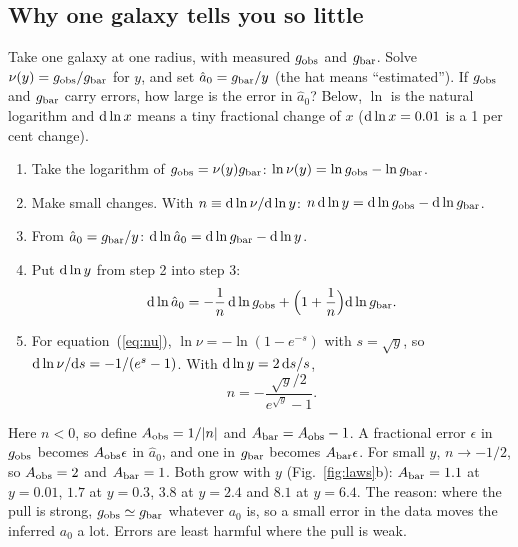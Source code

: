 \documentclass[fleqn,usenatbib]{mnras}
\begin{document}
\subsection{Why one galaxy tells you so little}
\label{sec:amp}
Take one galaxy at one radius, with measured $g_{\rm obs}$ and $g_{\rm bar}$. Solve $\nu(y)=g_{\rm obs}/g_{\rm bar}$ for $y$, and set $\hat a_0=g_{\rm bar}/y$ (the hat means ``estimated''). If $g_{\rm obs}$ and $g_{\rm bar}$ carry errors, how large is the error in $\hat a_0$? Below, $\ln$ is the natural logarithm and ${\rm d}\ln x$ means a tiny fractional change of $x$ (${\rm d}\ln x=0.01$ is a 1 per cent change).
\begin{enumerate}
\item Take the logarithm of $g_{\rm obs}=\nu(y)g_{\rm bar}$: $\ln\nu(y)=\ln g_{\rm obs}-\ln g_{\rm bar}$.
\item Make small changes. With $n\equiv{\rm d}\ln\nu/{\rm d}\ln y$: $n\,{\rm d}\ln y={\rm d}\ln g_{\rm obs}-{\rm d}\ln g_{\rm bar}$.
\item From $\hat a_0=g_{\rm bar}/y$: ${\rm d}\ln\hat a_0={\rm d}\ln g_{\rm bar}-{\rm d}\ln y$.
\item Put ${\rm d}\ln y$ from step 2 into step 3:
\begin{equation}
{\rm d}\ln\hat a_0=-\frac1n\,{\rm d}\ln g_{\rm obs}+\Big(1+\frac1n\Big){\rm d}\ln g_{\rm bar}.
\label{eq:amp}
\end{equation}
\item For equation~(\ref{eq:nu}), $\ln\nu=-\ln(1-e^{-s})$ with $s=\sqrt y$, so ${\rm d}\ln\nu/{\rm d}s=-1/(e^{s}-1)$. With ${\rm d}\ln y=2\,{\rm d}s/s$,
\begin{equation}
n=-\frac{\sqrt y/2}{e^{\sqrt y}-1}.
\end{equation}
\end{enumerate}
Here $n<0$, so define $A_{\rm obs}=1/|n|$ and $A_{\rm bar}=A_{\rm obs}-1$. A fractional error $\epsilon$ in $g_{\rm obs}$ becomes $A_{\rm obs}\epsilon$ in $\hat a_0$, and one in $g_{\rm bar}$ becomes $A_{\rm bar}\epsilon$. For small $y$, $n\to-1/2$, so $A_{\rm obs}=2$ and $A_{\rm bar}=1$. Both grow with $y$ (Fig.~\ref{fig:laws}b): $A_{\rm bar}=1.1$ at $y=0.01$, $1.7$ at $y=0.3$, $3.8$ at $y=2.4$ and $8.1$ at $y=6.4$. The reason: where the pull is strong, $g_{\rm obs}\simeq g_{\rm bar}$ whatever $a_0$ is, so a small error in the data moves the inferred $a_0$ a lot. Errors are least harmful where the pull is weak.
\end{document}
